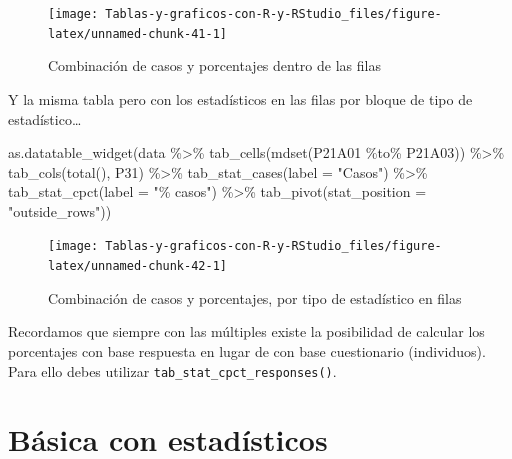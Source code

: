 \documentclass[
]{book}
\newenvironment{Shaded}{\begin{snugshade}}{\end{snugshade}}
\newcommand{\AttributeTok}[1]{\textcolor[rgb]{0.77,0.63,0.00}{#1}}
\newcommand{\FunctionTok}[1]{\textcolor[rgb]{0.00,0.00,0.00}{#1}}
\newcommand{\NormalTok}[1]{#1}
\newcommand{\SpecialCharTok}[1]{\textcolor[rgb]{0.00,0.00,0.00}{#1}}
\newcommand{\StringTok}[1]{\textcolor[rgb]{0.31,0.60,0.02}{#1}}
\begin{document}
\begin{figure}[H]

{\centering \texttt{[image: Tablas-y-graficos-con-R-y-RStudio\_files/figure-latex/unnamed-chunk-41-1]} 

}

\caption{Combinación de casos y porcentajes dentro de las filas}\label{fig:unnamed-chunk-41}
\end{figure}

Y la misma tabla pero con los estadísticos en las filas por bloque de tipo de estadístico\ldots{}

\begin{Shaded}
\begin{Highlighting}[]
\FunctionTok{as.datatable\_widget}\NormalTok{(data }\SpecialCharTok{\%\textgreater{}\%}
  \FunctionTok{tab\_cells}\NormalTok{(}\FunctionTok{mdset}\NormalTok{(P21A01 }\SpecialCharTok{\%to\%}\NormalTok{ P21A03)) }\SpecialCharTok{\%\textgreater{}\%}
  \FunctionTok{tab\_cols}\NormalTok{(}\FunctionTok{total}\NormalTok{(), P31) }\SpecialCharTok{\%\textgreater{}\%}
  \FunctionTok{tab\_stat\_cases}\NormalTok{(}\AttributeTok{label =} \StringTok{"Casos"}\NormalTok{) }\SpecialCharTok{\%\textgreater{}\%}
  \FunctionTok{tab\_stat\_cpct}\NormalTok{(}\AttributeTok{label =} \StringTok{"\% casos"}\NormalTok{) }\SpecialCharTok{\%\textgreater{}\%}
  \FunctionTok{tab\_pivot}\NormalTok{(}\AttributeTok{stat\_position =} \StringTok{"outside\_rows"}\NormalTok{))}
\end{Highlighting}
\end{Shaded}

\begin{figure}[H]

{\centering \texttt{[image: Tablas-y-graficos-con-R-y-RStudio\_files/figure-latex/unnamed-chunk-42-1]} 

}

\caption{Combinación de casos y porcentajes, por tipo de estadístico en filas}\label{fig:unnamed-chunk-42}
\end{figure}

Recordamos que siempre con las múltiples existe la posibilidad de calcular los porcentajes con base respuesta en lugar de con base cuestionario (individuos). Para ello debes utilizar \texttt{tab\_stat\_cpct\_responses()}.

\hypertarget{buxe1sica-con-estaduxedsticos}{%
\section{Básica con estadísticos}\label{buxe1sica-con-estaduxedsticos}}
\end{document}
